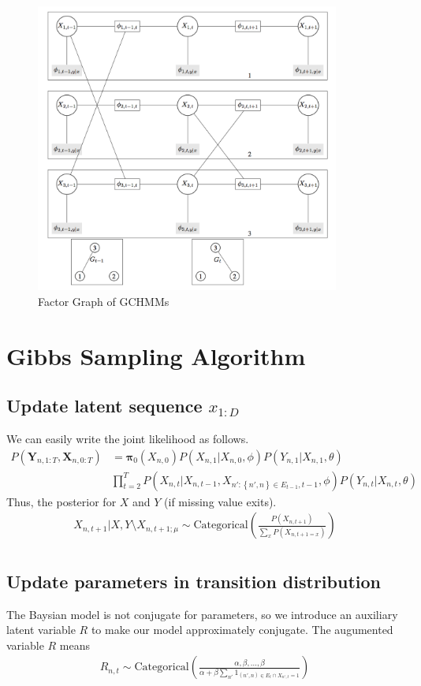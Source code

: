 \documentclass{article} %
\begin{document}
\begin{figure}[t]
\centering
\includegraphics[width=100mm]{EM_GCHMM.png}
\caption{Factor Graph of GCHMMs}
\label{fig:fgchmm}
\end{figure}

\section{Gibbs Sampling Algorithm}

\subsection{Update latent sequence $x_{1:D}$}
We can easily write the joint likelihood as follows.
\begin{align*}
P(\mathbf{Y}_{n,1:T}, \mathbf{X}_{n,0:T}) 
&= \boldsymbol{\pi}_0(X_{n,0})P(X_{n,1}|X_{n,0},\phi)P(Y_{n,1}|X_{n, 1}, \theta)\\
&\prod_{t = 2}^{T} P(X_{n,t}|X_{n, t-1}, X_{n': \left \{ n',n \right \}\in E_{t-1},t-1}, \phi)P(Y_{n,t}|X_{n, t}, \theta)
\end{align*}
Thus, the posterior for $X$ and $Y$ (if missing value exits).
\begin{align*}
X_{n,t+1}|{X,Y} \setminus X_{n,t+1;\mu} \sim \text{Categorical}\left( \frac{P(X_{n,t+1})}{\sum_{x}P(X_{n,t+1=x})}\right) \\
\end{align*}

\subsection{Update parameters in transition distribution}
The Baysian model is not conjugate for parameters, so we introduce an auxiliary latent variable $R$ to make our model approximately conjugate. 
The augumented variable $R$ means 
\begin{align*}
R_{n,t} \sim \text{Categorical}\left( \frac{\alpha,\beta, ..., \beta }{\alpha +\beta\sum_{n'}1_{(n',n)\in E_{t}\cap X_{n',t} =1} } \right)
\end{align*}
\end{document}

